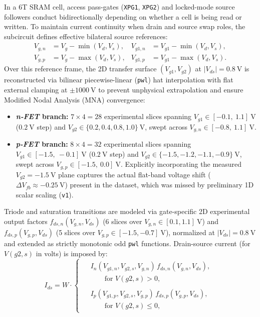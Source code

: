 \documentclass[conference]{IEEEtran}
\begin{document}
In a 6T SRAM cell, access pass-gates (\texttt{XPG1}, \texttt{XPG2}) and locked-mode source followers conduct bidirectionally depending on whether a cell is being read or written. To maintain current continuity when drain and source swap roles, the subcircuit defines effective bilateral source references:
\begin{align}
V_{g,n} &= V_g - \min(V_d, V_s), & V_{g1,n} &= V_{g1} - \min(V_d, V_s), \label{eq:bilateral_n}\\
V_{g,p} &= V_g - \max(V_d, V_s), & V_{g1,p} &= V_{g1} - \max(V_d, V_s). \label{eq:bilateral_p}
\end{align}
Over this reference frame, the 2D transfer surface $(V_{g1}, V_{g2})$ at $|V_{ds}| = 0.8\ \text{V}$ is reconstructed via bilinear piecewise-linear (\texttt{pwl}) hat interpolation with flat external clamping at $\pm 1000\ \text{V}$ to prevent unphysical extrapolation and ensure Modified Nodal Analysis (MNA) convergence:
\begin{itemize}
    \item \textbf{\textit{n-FET} branch:} $7 \times 4 = 28$ experimental slices spanning $V_{g1} \in [-0.1,\ 1.1]\ \text{V}$ ($0.2\ \text{V}$ step) and $V_{g2} \in \{0.2, 0.4, 0.8, 1.0\}\ \text{V}$, swept across $V_{g,n} \in [-0.8,\ 1.1]\ \text{V}$.
    \item \textbf{\textit{p-FET} branch:} $8 \times 4 = 32$ experimental slices spanning $V_{g1} \in [-1.5,\ -0.1]\ \text{V}$ ($0.2\ \text{V}$ step) and $V_{g2} \in \{-1.5, -1.2, -1.1, -0.9\}\ \text{V}$, swept across $V_{g,p} \in [-1.5,\ 0.0]\ \text{V}$. Explicitly incorporating the measured $V_{g2} = -1.5\ \text{V}$ plane captures the actual flat-band voltage shift ($\Delta V_{fb} \approx -0.25\ \text{V}$) present in the dataset, which was missed by preliminary 1D scalar scaling (\texttt{v1}).
\end{itemize}
Triode and saturation transitions are modeled via gate-specific 2D experimental output factors $f_{ds,n}(V_{g,n}, V_{ds})$ (6 slices over $V_{g,n} \in [0.1, 1.1]\ \text{V}$) and $f_{ds,p}(V_{g,p}, V_{ds})$ (5 slices over $V_{g,p} \in [-1.5, -0.7]\ \text{V}$), normalized at $|V_{ds}| = 0.8\ \text{V}$ and extended as strictly monotonic odd \texttt{pwl} functions. Drain-source current (for $V(g2,s)$ in volts) is imposed by:
\begin{equation}\label{eq:bp_current}
I_{ds} = W \cdot
\begin{cases}
\begin{aligned}
&I_n(V_{g1,n}, V_{g2,s}, V_{g,n})\, f_{ds,n}(V_{g,n}, V_{ds}), \\[-2pt]
&\qquad\text{for } V(g2,s) > 0,
\end{aligned} \\[8pt]
\begin{aligned}
&I_p(V_{g1,p}, V_{g2,s}, V_{g,p})\, f_{ds,p}(V_{g,p}, V_{ds}), \\[-2pt]
&\qquad\text{for } V(g2,s) \le 0,
\end{aligned}
\end{cases}
\end{equation}
\end{document}
